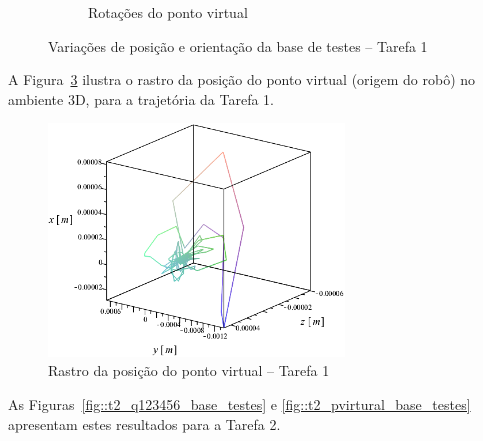 \begin{figure}[h]
\begin{subfigure}[b]{0.48\textwidth}
        \caption{Rotações do ponto virtual}
        \label{fig::t1_q456_base_testes}
    \end{subfigure}
    \caption{Variações de posição e orientação da base de testes -- Tarefa 1}
    \label{fig::t1_q123456_base_testes}
\end{figure}

A Figura~\ref{fig::t1_pvirtural_base_testes} ilustra o rastro da posição do
ponto virtual (origem do robô) no ambiente 3D, para a trajetória da Tarefa 1.

\begin{figure}[h!]
	\centering 
 	\includegraphics[width=0.70\textwidth]{figs/t1_pvirtural_base_testes}
 	\caption{Rastro da posição do ponto virtual -- Tarefa 1}
 	\label{fig::t1_pvirtural_base_testes}
\end{figure}

As Figuras~\ref{fig::t2_q123456_base_testes} e
\ref{fig::t2_pvirtural_base_testes} apresentam estes resultados para a
Tarefa 2.

